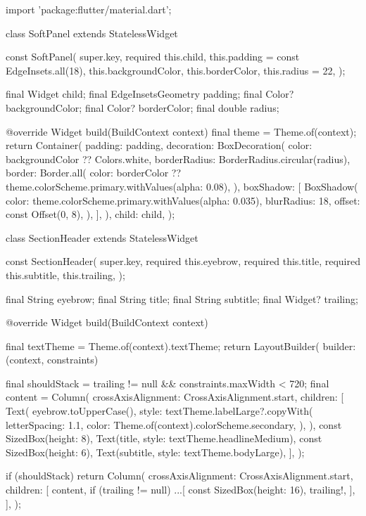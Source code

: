 \documentclass[11pt,a4paper]{article}
\begin{document}
\begin{codeblock}
import 'package:flutter/material.dart';

class SoftPanel extends StatelessWidget {
  const SoftPanel({
    super.key,
    required this.child,
    this.padding = const EdgeInsets.all(18),
    this.backgroundColor,
    this.borderColor,
    this.radius = 22,
  });

  final Widget child;
  final EdgeInsetsGeometry padding;
  final Color? backgroundColor;
  final Color? borderColor;
  final double radius;

  @override
  Widget build(BuildContext context) {
    final theme = Theme.of(context);
    return Container(
      padding: padding,
      decoration: BoxDecoration(
        color: backgroundColor ?? Colors.white,
        borderRadius: BorderRadius.circular(radius),
        border: Border.all(
          color:
              borderColor ?? theme.colorScheme.primary.withValues(alpha: 0.08),
        ),
        boxShadow: [
          BoxShadow(
            color: theme.colorScheme.primary.withValues(alpha: 0.035),
            blurRadius: 18,
            offset: const Offset(0, 8),
          ),
        ],
      ),
      child: child,
    );
  }
}

class SectionHeader extends StatelessWidget {
  const SectionHeader({
    super.key,
    required this.eyebrow,
    required this.title,
    required this.subtitle,
    this.trailing,
  });

  final String eyebrow;
  final String title;
  final String subtitle;
  final Widget? trailing;

  @override
  Widget build(BuildContext context) {
    final textTheme = Theme.of(context).textTheme;
    return LayoutBuilder(
      builder: (context, constraints) {
        final shouldStack = trailing != null && constraints.maxWidth < 720;
        final content = Column(
          crossAxisAlignment: CrossAxisAlignment.start,
          children: [
            Text(
              eyebrow.toUpperCase(),
              style: textTheme.labelLarge?.copyWith(
                letterSpacing: 1.1,
                color: Theme.of(context).colorScheme.secondary,
              ),
            ),
            const SizedBox(height: 8),
            Text(title, style: textTheme.headlineMedium),
            const SizedBox(height: 6),
            Text(subtitle, style: textTheme.bodyLarge),
          ],
        );

        if (shouldStack) {
          return Column(
            crossAxisAlignment: CrossAxisAlignment.start,
            children: [
              content,
              if (trailing != null) ...[
                const SizedBox(height: 16),
                trailing!,
              ],
            ],
          );
        }

}}}
\end{codeblock}
\end{document}
